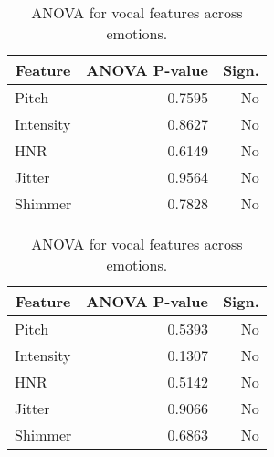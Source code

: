 \begin{table}[H]
    \centering 
    \begin{subtable}[b]{0.48\textwidth}
        \centering
        \caption*{\textbf{Positive recordings}}
        \begin{tabular}{lrr}
        \toprule
        \multicolumn{1}{c}{\textbf{Feature}} & \textbf{ANOVA P-value} & \textbf{Sign.} \\
        \midrule
        Pitch      & 0.7595    & No          \\
        Intensity  & 0.8627    & No          \\
        HNR        & 0.6149    & No          \\
        Jitter     & 0.9564    & No          \\
        Shimmer    & 0.7828    & No          \\
        \bottomrule
        \end{tabular}
        \caption{ANOVA: Positive recordings.}
        \label{tab:rq1_anova_pos}
    \end{subtable}
    \hfill
    \begin{subtable}[b]{0.48\textwidth}
        \centering
        \caption*{\textbf{Negative recordings}}
        \begin{tabular}{lrr}
        \toprule
        \multicolumn{1}{c}{\textbf{Feature}} & \textbf{ANOVA P-value} & \textbf{Sign.} \\
        \midrule
        Pitch      & 0.5393    & No          \\
        Intensity  & 0.1307    & No          \\
        HNR        & 0.5142    & No          \\
        Jitter     & 0.9066    & No          \\
        Shimmer    & 0.6863    & No          \\
        \bottomrule
        \end{tabular}
        \caption{ANOVA: Negative recordings.}
        \label{tab:rq1_anova_neg}
    \end{subtable}
    \caption{ANOVA for vocal features across emotions.}
    \label{tab:rq1_anova_all}
\end{table}  



